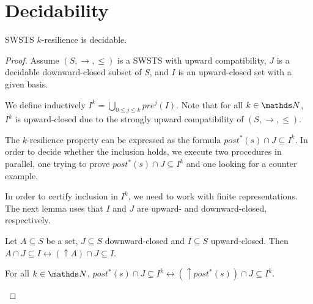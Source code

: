 
\section{Decidability}

\begin{theorem}
{\sc SWSTS $k$-resilience} is decidable.
\end{theorem}

\begin{proof}

Assume  $(S, \rightarrow, \leq)$ is a SWSTS with upward compatibility, $J$ is a decidable downward-closed subset of $S$, and $I$ is an upward-closed set with a given basis.

We define inductively
$I^{k} = \bigcup_{0 \leq j \leq k} pre^j(I)$. Note that for all $k \in \N$, $I^k$ is upward-closed due to
the strongly upward compatibility of $(S, \rightarrow, \leq)$.


The $k$-resilience property can be expressed as the formula
$ post^*(s) \cap J \subseteq I^k$. In order to decide whether the inclusion holds, we execute two procedures in parallel, one trying to prove $ post^*(s)\cap J \subseteq I^k$ 
and one looking for a counter example.

In order to certify inclusion in $I^k$, we need to work with finite representations.
The next lemma uses that $I$ and $J$ are upward- and downward-closed, respectively.

\begin{lemma}
Let $A \subseteq S$ be a set, $J \subseteq S$ downward-closed and $I \subseteq S$ upward-closed. 
Then $A \cap J \subseteq I \leftrightarrow (\uparrow  A) \cap J \subseteq I$.
\end{lemma}


\begin{corollary}
For all $k \in \N$,
$ post^*(s)\cap J \subseteq I^k \leftrightarrow (\uparrow  post^*(s)) \cap J \subseteq I^k$. 
\end{corollary}





\end{proof}
